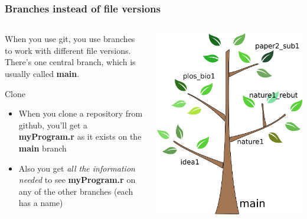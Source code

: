 \documentclass{beamer}
\begin{document}
\begin{frame}
  \frametitle{Branches instead of file versions}
  \begin{columns}[T]
    \begin{column}{.5\textwidth}
      When you use git, you use \alert{branches} to work with
      different file versions. There's one central branch, which
      is usually called \textbf{main}.
      \begin{block}{Clone}
        \begin{itemize}
        \item When you \alert{clone} a repository from github, you'll get a
         \textbf{myProgram.r} as it exists on the \textbf{main} branch

        \item Also you get \emph{all the information needed} to see \textbf{myProgram.r}
          on any of the other branches (each has a name)
        \end{itemize}
      \end{block}
    \end{column}
    \begin{column}{.5\textwidth}
      \includegraphics[width=\textwidth]{tree.png}
    \end{column}
  \end{columns}
\end{frame}
\end{document}
